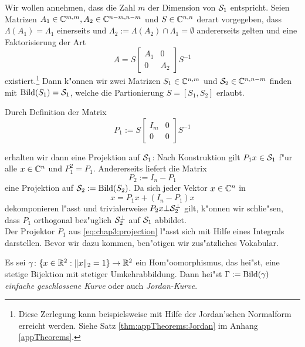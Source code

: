 Wir wollen annehmen, dass die Zahl $m$ der Dimension von $\S_1$ entspricht. Seien Matrizen $A_1\in\C^{m,m},
A_2\in\C^{n-m,n-m}$ und $S\in\Cnn$ derart vorgegeben, dass  $\Lambda(A_1) = \Lambda_1$ einerseits und $\Lambda_2 := \Lambda(A_2) \cap \Lambda_1 = \emptyset$ andererseits gelten und eine Faktorisierung der Art
\begin{equation}\label{eq:chap3:factorization}
A = S\begin{bmatrix} A_1 & 0 \\ 0 & A_2 \end{bmatrix} S^{-1}
\end{equation}
existiert.\footnote{Diese Zerlegung kann beispielsweise mit Hilfe der Jordan'schen Normalform erreicht werden. Siehe Satz \ref{thm:appTheorems:Jordan} im Anhang \ref{appTheorems}.}
Dann k"onnen wir zwei Matrizen $S_1 \in \C^{n,m}$ und
$\S_2 \in \C^{n,n-m}$ finden mit $\Bild(S_1) = \S_1$, welche die Partionierung $S=[S_1, S_2]$ erlaubt.

\newpage
Durch Definition der Matrix
\begin{equation}\label{eq:chap3:projection}
P_1 := S \begin{bmatrix} I_m & 0 \\ 0 & 0 \end{bmatrix}S^{-1}
\end{equation}

erhalten wir dann eine Projektion auf $\S_1$: Nach Konstruktion gilt $P_1 x \in \S_1$ f"ur alle $x\in\Cn$
und $P_1^2 = P_1$. Andererseits liefert die Matrix
\[
P_2 := I_n - P_1
\]
eine Projektion auf $\S_2 := \Bild(S_2)$.
Da sich jeder Vektor $x\in\Cn$ in
\[
x = P_1 x + (I_n - P_1)x
\]
dekomponieren l"asst und trivialerweise $P_2 x \bot \S_2^\bot$ gilt, k"onnen wir schlie"sen, dass $P_1$ orthogonal bez"uglich $\S_2^\bot$ auf $\S_1$ abbildet.\\

Der Projektor $P_1$ aus \eqref{eq:chap3:projection} l"asst sich mit Hilfe eines Integrals darstellen. Bevor wir dazu kommen, ben"otigen wir zus"atzliches Vokabular.

\begin{defn}\label{defn:chap3:jordanKurve}
Es sei $\gamma\colon\{x\in\R^2 : \|x\|_2 = 1\}\to\R^2$ ein Hom"oomorphismus, das hei"st, eine stetige Bijektion mit stetiger Umkehrabbildung.
Dann hei"st $\Gamma := \Bild(\gamma)$ \emph{einfache geschlossene Kurve} oder auch \emph{Jordan-Kurve}.
\end{defn}

